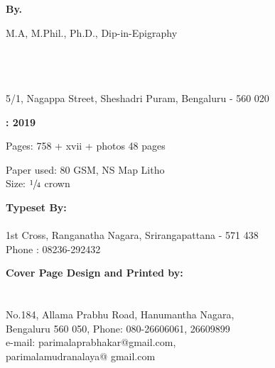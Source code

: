 \thispagestyle{empty}

\begin{center}
{\bf {}}

\bigskip

{\bf By. } 


{\fontsize{12pt}{10pt}\selectfont M.A, M.Phil., Ph.D., Dip-in-Epigraphy}


\vfil

{}\\[3pt]
{\bf{}}\\[3pt]
{\bf{}}\relax\\
5/1, Nagappa Street, Sheshadri Puram, Bengaluru - 560 020

\vfil

\textbf{: 2019}

\vfil

Pages: 758 + xvii + photos 48 pages

\vfil

Paper used:  80 GSM, NS Map Litho\\
Size:  $\sfrac{1}{4}$ crown

\vfil

{\bf {}}

\vfil

{\bf {}}

\vfil

{\bf Typeset By:}\\[4pt]
{\bf {}}\\
{1st Cross, Ranganatha Nagara, Srirangapattana - 571 438}\\
{Phone : 08236-292432}

\vfil


{\bf Cover Page Design and Printed by:}\\[4pt]
{\bf {}}\\
{\bf {}}\\
No.184, Allama Prabhu Road, Hanumantha Nagara,\\
Bengaluru 560 050, Phone: 080-26606061, 26609899\\
e-mail:  parimalaprabhakar@gmail.com,\\
parimalamudranalaya@ gmail.com
\end{center}
